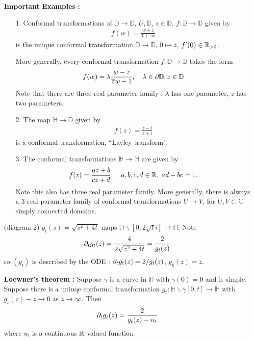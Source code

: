 \documentclass[12pt,a4paper]{article}
\begin{document}
\textbf{Important Examples :}
\begin{itemize}
\item[1.] Conformal transformations of $\mathbb{D} \rightarrow \mathbb{D}$, $U, \mathbb{D}$, $z\in \mathbb{D}$, $f:\mathbb{D}\rightarrow \mathbb{D}$ given by
\begin{align*}
f(w) = \frac{w+z}{1+ \bar{z}w}
\end{align*}
is the unique conformal transformation $\mathbb{D} \rightarrow \mathbb{D}$, $0\mapsto z$, $f'(0)\in \mathbb{R}_{>0}$.
\s

More generally, every conformal transformation $f: \mathbb{D}\rightarrow \mathbb{D}$ takes the form
\begin{align*}
f(w) = \lambda \frac{w-z}{\overline{z}w-1}, \quad \lambda \in \partial \mathbb{D}, z\in \mathbb{D}
\end{align*}
Note that there are three real parameter family : $\lambda$ has one parameter, $z$ has two parameters. 
\item[2.] The map $\mathbb{H} \rightarrow \mathbb{D}$ given by
\begin{align*}
f(z) = \frac{z-i}{z+i}
\end{align*}
is a conformal transformation, ``Layley transform".
\item[3.] The conformal transformations $\mathbb{H} \rightarrow \mathbb{H}$ are given by
\begin{align*}
f(z) = \frac{az+b}{cz+d}, \quad a,b,c,d\in \mathbb{R},\,\, ad-bc=1.
\end{align*}
Note this also has three real parameter family. More generally, there is always a 3-real parameter family of conformal transformations $U\rightarrow V$, for $U, V\subset \mathbb{C}$ simply connected domains.
\end{itemize}

(diagram 2)
$g_t(z)= \sqrt{z^2 + 4t}$ maps $\mathbb{H}\backslash[0, 2\sqrt{t}i] \rightarrow \mathbb{H}$. Note
\begin{align*}
\partial_t g_t(z) = \frac{4}{2\sqrt{z^2 + 4t}} = \frac{2}{g_t(z)}
\end{align*}
so $(g_t)$ is described by the ODE : $\partial_t g_t(z) = 2/g_t(z)$, $g_0(z)=z$.
\s

\textbf{Loewner's theorem :} Suppose $\gamma$ is a curve in $\mathbb{H}$ with $\gamma(0)=0$ and is simple. Suppose there is a uniuqe conformal transformation $g_t : \mathbb{H} \backslash \gamma[0,t] \rightarrow \mathbb{H}$ with $g_t(z)- z\rightarrow 0$ as $z\rightarrow \infty$. Then
\begin{align*}
\partial_t g_t(z) = \frac{2}{g_t(z) - u_t}
\end{align*}
where $u_t$ is a continuous $\mathbb{R}$-valued function.
\s
\end{document}
